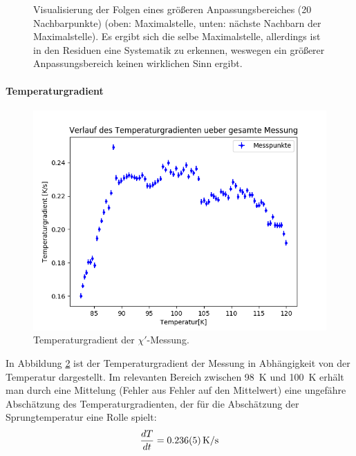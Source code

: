 \documentclass[12pt,a4paper]{article}
\begin{document}
\begin{figure}
\caption{Visualisierung der Folgen eines größeren Anpassungsbereiches (20 Nachbarpunkte) (oben: Maximalstelle, unten: nächste Nachbarn der Maximalstelle). Es ergibt sich die selbe Maximalstelle, allerdings ist in den Residuen eine Systematik zu erkennen, weswegen ein größerer Anpassungsbereich keinen wirklichen Sinn ergibt.}
\label{fig:Supra_X1anpassgross}
\end{figure}

\paragraph{Temperaturgradient}
\begin{figure}
\centering
\includegraphics[scale=0.8]{Bilder/Haupt_Supra/X1_temp.png}
\caption{Temperaturgradient der $\chi'$-Messung.}
\label{fig:Supra_X1_temp}
\end{figure}

In Abbildung \ref{fig:Supra_X1_temp} ist der Temperaturgradient der Messung in Abhängigkeit von der Temperatur dargestellt. Im relevanten Bereich zwischen \SI{98}{K} und \SI{100}{K} erhält man durch eine Mittelung (Fehler aus Fehler auf den Mittelwert) eine ungefähre Abschätzung des Temperaturgradienten, der für die Abschätzung der Sprungtemperatur eine Rolle spielt:
\begin{equation*}
\dfrac{dT}{dt} = \SI{0.236\pm 0.005}{K/s}
\end{equation*}

\newpage
\end{document}
